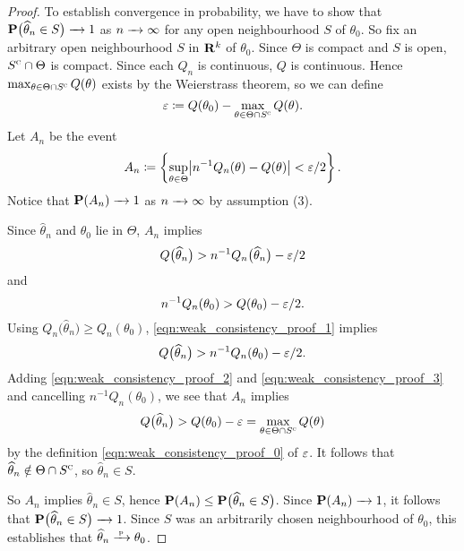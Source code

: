 \documentclass[11pt,letterpaper,reqno,oneside]{article}
\begin{document}
\begin{proof}
	To establish convergence in probability, we have to show that $\mathbf{P}\bigl( \widehat{\theta}_n \in S \bigr) \xrightarrow{\;\;\;} 1$ as $n\xrightarrow{\;\;\;}\infty$ for any open neighbourhood $S$ of $\theta_0$. So fix an arbitrary open neighbourhood $S$ in $\mathbf{R}^k$ of $\theta_0$. Since $\Theta$ is compact and $S$ is open, $S^{\textsc{c}} \cap \Theta$ is compact. Since each $Q_n$ is continuous, $Q$ is continuous. Hence $\max_{\theta \in \Theta \cap S^{\textsc{c}}} Q(\theta)$ exists by the Weierstrass theorem, so we can define
	\begin{equation}
		\varepsilon \coloneqq Q(\theta_0) 
		- \max_{\theta \in \Theta \cap S^{\textsc{c}}} Q(\theta) .
		\label{eqn:weak_consistency_proof_0}
	\end{equation}
	Let $A_n$ be the event
	\begin{equation*}
		A_n \coloneqq 
		\left\{ \sup_{\theta \in \Theta}
		\abs*{ n^{-1} Q_n(\theta) - Q(\theta) }
		< \eps/2 \right\} .
	\end{equation*}
	Notice that $\mathbf{P}(A_n) \xrightarrow{\;\;\;} 1$ as $n\xrightarrow{\;\;\;}\infty$ by assumption (3).


	Since $\widehat{\theta}_n$ and $\theta_0$ lie in $\Theta$, $A_n$ implies
	\begin{equation}
		Q\bigl( \widehat{\theta}_n \bigr) 
		> n^{-1} Q_n\bigl( \widehat{\theta}_n \bigr) - \varepsilon/2 
		\label{eqn:weak_consistency_proof_1}
	\end{equation}
	and
	\begin{equation}
		n^{-1} Q_n( \theta_0 )
		> Q( \theta_0 ) - \varepsilon/2 .
		\label{eqn:weak_consistency_proof_2}
	\end{equation}
	Using $Q_n\bigl( \widehat{\theta}_n \bigr) \geq Q_n( \theta_0 )$, \eqref{eqn:weak_consistency_proof_1} implies
	\begin{equation}
		Q\bigl( \widehat{\theta}_n \bigr) 
		> n^{-1} Q_n( \theta_0 ) - \varepsilon/2 .
		\label{eqn:weak_consistency_proof_3}
	\end{equation}
	Adding \eqref{eqn:weak_consistency_proof_2} and \eqref{eqn:weak_consistency_proof_3} and cancelling $n^{-1} Q_n( \theta_0 )$, we see that $A_n$ implies
	\begin{equation*}
		Q\bigl( \widehat{\theta}_n \bigr) 
		> Q( \theta_0 ) - \varepsilon 
		= \max_{\theta \in \Theta \cap S^{\textsc{c}}} Q(\theta)
	\end{equation*}
	by the definition \eqref{eqn:weak_consistency_proof_0} of $\varepsilon$. It follows that $\widehat{\theta}_n \notin \Theta \cap S^{\textsc{c}}$, so $\widehat{\theta}_n \in S$.

	So $A_n$ implies $\widehat{\theta}_n \in S$, hence $\mathbf{P}( A_n ) \leq \mathbf{P}\bigl( \widehat{\theta}_n \in S \bigr)$. Since $\mathbf{P}(A_n) \xrightarrow{\;\;\;} 1$, it follows that $\mathbf{P}\bigl( \widehat{\theta}_n \in S \bigr) \xrightarrow{\;\;\;} 1$. Since $S$ was an arbitrarily chosen neighbourhood of $\theta_0$, this establishes that $\widehat{\theta}_n \xrightarrow{{\scriptscriptstyle \mathrm{\;p\;}}} \theta_0$.
\end{proof}
\end{document}
